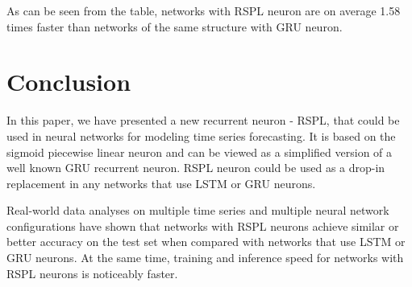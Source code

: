 \documentclass[sn-apa]{sn-jnl}%
\begin{document}
As can be seen from the table, networks with RSPL neuron are on average 1.58 times faster than networks of the same structure with GRU neuron.

\section{Conclusion}\label{sec7}
In this paper, we have presented a new recurrent neuron - RSPL, that could be used in neural networks for modeling time series forecasting. It is based on the sigmoid piecewise linear neuron and can be viewed as a simplified version of a well known GRU recurrent neuron. RSPL neuron could be used as a drop-in replacement in any networks that use LSTM or GRU neurons.

Real-world data analyses on multiple time series and multiple neural network configurations have shown that networks with RSPL neurons achieve similar or better accuracy on the test set when compared with networks that use LSTM or GRU neurons. At the same time, training and inference speed for networks with RSPL neurons is noticeably faster.


\end{document}
